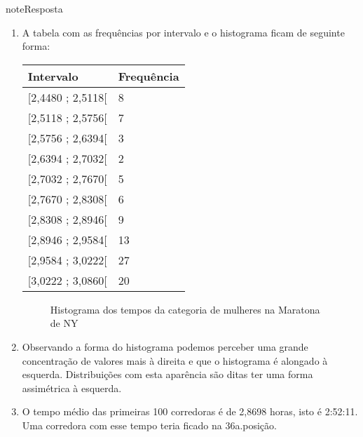 \begin{sphinxadmonition}{note}{Resposta}
\begin{enumerate}
\item {} 
A tabela com as frequências por intervalo e o histograma ficam de seguinte forma:


\begin{savenotes}\sphinxattablestart
\centering
{}
\label{\detokenize{PE104-0:id16}}
\sphinxaftercaption
\begin{tabulary}{\linewidth}[t]{|T|T|}
\hline

Intervalo
&
Frequência
\\
\hline
{[}2,4480 ; 2,5118{[}
&
8
\\
\hline
{[}2,5118 ; 2,5756{[}
&
7
\\
\hline
{[}2,5756 ; 2,6394{[}
&
3
\\
\hline
{[}2,6394 ; 2,7032{[}
&
2
\\
\hline
{[}2,7032 ; 2,7670{[}
&
5
\\
\hline
{[}2,7670 ; 2,8308{[}
&
6
\\
\hline
{[}2,8308 ; 2,8946{[}
&
9
\\
\hline
{[}2,8946 ; 2,9584{[}
&
13
\\
\hline
{[}2,9584 ; 3,0222{[}
&
27
\\
\hline
{[}3,0222 ; 3,0860{[}
&
20
\\
\hline
\end{tabulary}
\par
\sphinxattableend\end{savenotes}

\begin{figure}[H]
\centering
\capstart

\noindent{}
\caption{Histograma dos tempos da categoria de mulheres na Maratona de NY}\label{\detokenize{PE104-0:hist-maratona-mulheres-res}}\label{\detokenize{PE104-0:id17}}\end{figure}

\item {} 
Observando a forma do histograma podemos perceber uma grande concentração de valores mais à direita e que o histograma é alongado à esquerda. Distribuições com esta aparência são ditas ter uma forma assimétrica à esquerda.

\item {} 
O tempo médio das primeiras 100 corredoras é de 2,8698 horas, isto é 2:52:11. Uma corredora com esse tempo teria ficado na 36a.posição.


\end{enumerate}
\end{sphinxadmonition}
